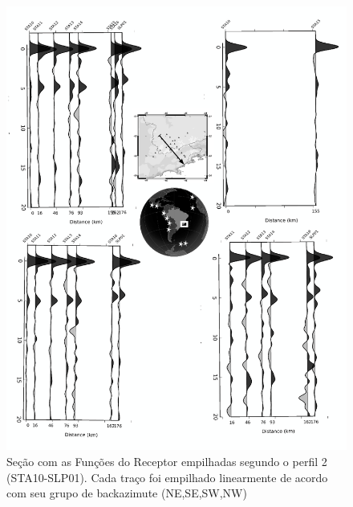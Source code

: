 \begin{figure}[!ht]
\centering
\includegraphics[scale=0.15]{Figs/RF_azimute_perfil2.png}
\caption{Seção com as Funções do Receptor empilhadas segundo o perfil 2 (STA10-SLP01). Cada traço foi empilhado linearmente de acordo com seu grupo de backazimute (NE,SE,SW,NW)}
\label{RF_perfil2}
\end{figure}

